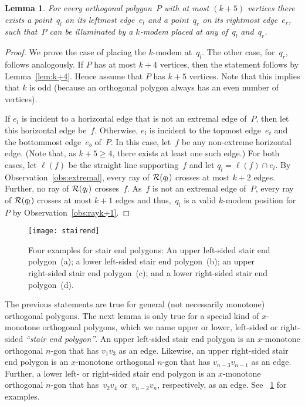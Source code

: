 \documentclass[A4]{article}
\newtheorem{lemma}[theorem]{Lemma}
\begin{document}
\begin{lemma}\label{lem:k+5}
For every orthogonal polygon~$P$ with at most $(k+5)$ vertices there exists a point~$q_l$ on its leftmost edge~$e_l$ and a point~$q_r$ on its rightmost edge~$e_r$, such that~$P$ can be illuminated by a \mbox{$k$-modem} placed at any of~$q_l$ and~$q_r$.
\end{lemma}
\begin{proof}
We prove the case of placing the \mbox{$k$-modem} at~$q_l$.
The other case, for~$q_r$, follows analogously.
If $P$ has at most $k+4$ vertices, then the statement follows by Lemma~\ref{lem:k+4}.
Hence assume that $P$ has $k+5$ vertices. Note that this implies that $k$ is odd (because an orthogonal polygon always has an even number of vertices).

If $e_l$ is incident to a horizontal edge that is not an extremal edge of~$P$, then let this horizontal edge be~$f$.
Otherwise, $e_l$ is incident to the topmost edge~$e_t$ and the bottommost edge~$e_b$ of~$P$.
In this case, let~$f$ be any non-extreme horizontal edge.
(Note that, as $k+5 \geq 4$, there exists at least one such edge.)
For both cases, let $\ell(f)$ be the straight line supporting~$f$ and let $q_l=\ell(f)\cap e_l$.
By Observation~\ref{obs:extremal}, every ray of ${\cal R}(q_l)$ crosses at most $k+2$ edges.
Further, no ray of ${\cal R}(q_l)$ crosses~$f$.
As~$f$ is not an extremal edge of~$P$, every ray of ${\cal R}(q_l)$ crosses at most $k+1$ edges and thus,~$q_l$ is a valid \mbox{$k$-modem} position for~$P$ by Observation~\ref{obs:rayk+1}.
\end{proof}


\begin{figure}[htb]
  \centering
  \texttt{[image: stairend]}
  \caption{Four examples for stair end polygons:
	  An upper left-sided stair end polygon~(a);
  	  a lower left-sided stair end polygon~(b);
	  an upper right-sided stair end polygon~(c); and 
  	  a lower right-sided stair end polygon~(d).}
  \label{fig:stairend}
\end{figure}

The previous statements are true for general (not necessarily monotone) orthogonal polygons.
The next lemma is only true for a special kind of $x$-monotone orthogonal polygons, which we name upper or lower, left-sided or right-sided \emph{``stair end polygon''}.
An upper left-sided stair end polygon is an $x$-monotone orthogonal $n$-gon that has $v_1v_3$ as an edge.
Likewise, an upper right-sided stair end polygon is an $x$-monotone orthogonal $n$-gon that has $v_{n-3}v_{n-1}$ as an edge.
Further, a lower left- or right-sided stair end polygon is an $x$-monotone orthogonal $n$-gon that has~$v_{2}v_{4}$ or~$v_{n-2}v_{n}$, respectively, as an edge.
See \figurename~\ref{fig:stairend} for examples.
\end{document}
